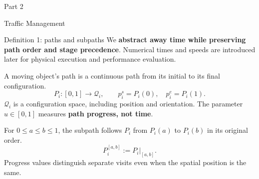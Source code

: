 \begin{frame}[plain]
\centering
{\color{accent}\LARGE Part 2\par}\vspace{8mm}
{\LARGE Traffic Management\par}
\end{frame}

\begin{frame}{Definition 1: paths and subpaths}
\small We \textbf{abstract away time while preserving path order and stage precedence}. Numerical times and speeds are introduced later for physical execution and performance evaluation.
\medskip\par
\normalsize A moving object's path is a continuous path from its initial to its final configuration.
\begin{equation}
P_i:[0,1]\longrightarrow\mathcal Q_i,\qquad p_i^s=P_i(0),\quad p_i^e=P_i(1).
\tag{1}
\end{equation}
\small $\mathcal Q_i$ is a configuration space, including position and orientation. The parameter $u\in[0,1]$ measures \textbf{path progress, not time}.
\medskip\par
\normalsize For $0\le a\le b\le1$, the subpath follows $P_i$ from $P_i(a)$ to $P_i(b)$ in its original order.
\begin{equation}
P_i^{[a,b]}:=P_i\big|_{[a,b]}.
\tag{2}
\end{equation}
\small Progress values distinguish separate visits even when the spatial position is the same.
\end{frame}

